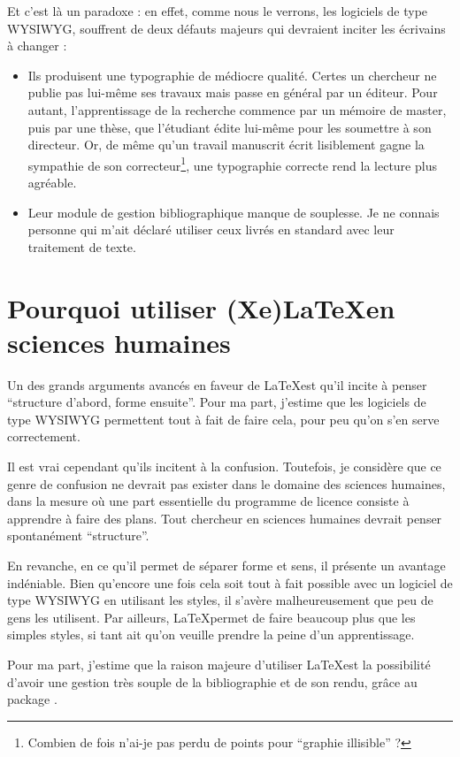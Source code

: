 Et c'est là un paradoxe : en effet, comme nous le verrons, les logiciels de type WYSIWYG, souffrent de deux défauts majeurs qui devraient inciter les écrivains à changer :
\begin{itemize}
\item Ils produisent une typographie de médiocre qualité. Certes un chercheur ne publie pas lui-même ses travaux mais passe en général par un éditeur. Pour autant, l'apprentissage de la recherche commence par un mémoire de master, puis par une thèse, que l'étudiant édite lui-même pour les soumettre à son directeur. Or, de même qu'un travail manuscrit écrit lisiblement gagne la sympathie de son correcteur\footnote{Combien de fois n'ai-je pas perdu de points pour \enquote{graphie illisible} ?},  une typographie correcte rend la lecture plus agréable.
\item Leur module de gestion bibliographique manque de souplesse. Je ne connais personne qui m'ait déclaré utiliser ceux livrés en standard avec leur traitement de texte.
\end{itemize}

\section{Pourquoi utiliser (Xe)\LaTeX en sciences humaines}

Un des grands arguments avancés en faveur de \LaTeX est qu'il incite à penser \enquote{structure d'abord, forme ensuite}. Pour ma part, j'estime que les logiciels de type WYSIWYG permettent tout à fait de faire cela, pour peu qu'on s'en serve correctement. 

Il est vrai cependant qu'ils incitent à la confusion. Toutefois, je considère que ce genre de confusion ne devrait pas exister dans le domaine des sciences humaines, dans la mesure où une part essentielle du programme de licence consiste à apprendre à faire des plans. Tout chercheur en sciences humaines devrait penser spontanément \enquote{structure}.

En revanche, en ce qu'il permet de séparer forme et sens, il présente un avantage indéniable. Bien qu'encore une fois cela soit tout à fait possible avec un logiciel de type WYSIWYG en utilisant les styles,  il s'avère malheureusement que peu de gens les utilisent. Par ailleurs, \LaTeX permet de faire beaucoup plus que les simples styles, si tant ait qu'on veuille prendre la peine d'un apprentissage.

Pour ma part, j'estime que la raison majeure d'utiliser \LaTeX est la possibilité d'avoir une gestion très souple de la bibliographie et de son rendu, grâce au package . 

